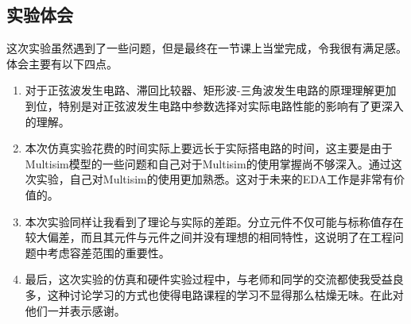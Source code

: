 \documentclass[12pt,a4paper]{article}
\begin{document}
\begin{spacing}{1.3}
\section{实验体会}
这次实验虽然遇到了一些问题，但是最终在一节课上当堂完成，令我很有满足感。体会主要有以下四点。\par
\begin{enumerate}
\item 对于正弦波发生电路、滞回比较器、矩形波-三角波发生电路的原理理解更加到位，特别是对正弦波发生电路中参数选择对实际电路性能的影响有了更深入的理解。
\item 本次仿真实验花费的时间实际上要远长于实际搭电路的时间，这主要是由于Multisim模型的一些问题和自己对于Multisim的使用掌握尚不够深入。通过这次实验，自己对Multisim的使用更加熟悉。这对于未来的EDA工作是非常有价值的。
\item 本次实验同样让我看到了理论与实际的差距。分立元件不仅可能与标称值存在较大偏差，而且其元件与元件之间并没有理想的相同特性，这说明了在工程问题中考虑容差范围的重要性。
\item 最后，这次实验的仿真和硬件实验过程中，与老师和同学的交流都使我受益良多，这种讨论学习的方式也使得电路课程的学习不显得那么枯燥无味。在此对他们一并表示感谢。
\end{enumerate}
\end{spacing}
\end{document}
